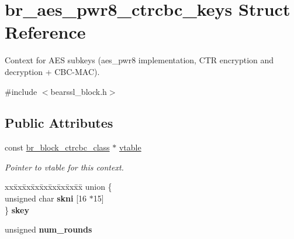 \hypertarget{structbr__aes__pwr8__ctrcbc__keys}{}\section{br\+\_\+aes\+\_\+pwr8\+\_\+ctrcbc\+\_\+keys Struct Reference}
\label{structbr__aes__pwr8__ctrcbc__keys}


Context for A\+ES subkeys ({\ttfamily aes\+\_\+pwr8} implementation, C\+TR encryption and decryption + C\+B\+C-\/\+M\+AC).  




{\ttfamily \#include $<$bearssl\+\_\+block.\+h$>$}

\subsection*{Public Attributes}
\begin{DoxyCompactItemize}
\item 
\mbox{\label{structbr__aes__pwr8__ctrcbc__keys_a4cd7c894e9d1c96cc24f18ecf542a559}} 
const \hyperlink{bearssl__block_8h_acc35dad952fda67b68df0b107fe26f0b}{br\+\_\+block\+\_\+ctrcbc\+\_\+class} $\ast$ \hyperlink{structbr__aes__pwr8__ctrcbc__keys_a4cd7c894e9d1c96cc24f18ecf542a559}{vtable}
\begin{DoxyCompactList}\small\item\em Pointer to vtable for this context. \end{DoxyCompactList}\item 
\mbox{\label{structbr__aes__pwr8__ctrcbc__keys_aba4254ec92a063e6cb291a2cfd871a02}} 
\begin{tabbing}
xx\=xx\=xx\=xx\=xx\=xx\=xx\=xx\=xx\=\kill
union \{\\
\>unsigned char {\bfseries skni} \mbox{[}16 $\ast$15\mbox{]}\\
\} {\bfseries skey}\\

\end{tabbing}\item 
\mbox{\label{structbr__aes__pwr8__ctrcbc__keys_a8b77a6a02ddd914fd1432fc17d75912f}} 
unsigned {\bfseries num\+\_\+rounds}
\end{DoxyCompactItemize}


